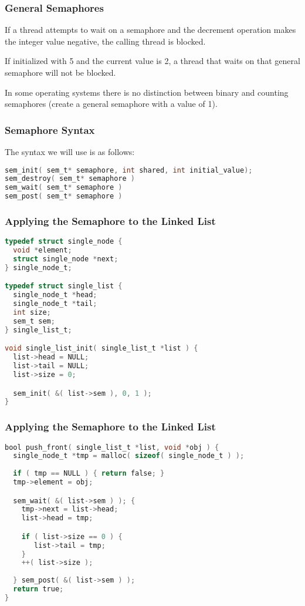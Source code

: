 \begin{frame}
	\frametitle{General Semaphores}

	If a thread attempts to wait on a semaphore and the decrement operation makes the integer value negative, the calling thread is blocked.

	If initialized with 5 and the current value is 2, a thread that waits on that general semaphore will not be blocked.

	In some operating systems there is no distinction between binary and counting semaphores (create a general semaphore with a value of 1).

\end{frame}

\begin{frame}[fragile]
	\frametitle{Semaphore Syntax}

	The syntax we will use is as follows:

	\begin{lstlisting}[language=C]
sem_init( sem_t* semaphore, int shared, int initial_value);
sem_destroy( sem_t* semaphore )
sem_wait( sem_t* semaphore )
sem_post( sem_t* semaphore )
\end{lstlisting}

\end{frame}

\begin{frame}[fragile]
	\frametitle{Applying the Semaphore to the Linked List}

	\begin{lstlisting}[language=C]
typedef struct single_node {
  void *element;
  struct single_node *next;
} single_node_t;

typedef struct single_list {
  single_node_t *head;
  single_node_t *tail;
  int size;
  sem_t sem;
} single_list_t;

void single_list_init( single_list_t *list ) {
  list->head = NULL;
  list->tail = NULL;
  list->size = 0;

  sem_init( &( list->sem ), 0, 1 );
}
\end{lstlisting}

\end{frame}

\begin{frame}[fragile]
	\frametitle{Applying the Semaphore to the Linked List}

	\begin{lstlisting}[language=C]
bool push_front( single_list_t *list, void *obj ) {
  single_node_t *tmp = malloc( sizeof( single_node_t ) );
  
  if ( tmp == NULL ) { return false; }  
  tmp->element = obj;

  sem_wait( &( list->sem ) ); {  
    tmp->next = list->head;
    list->head = tmp;

    if ( list->size == 0 ) {
       list->tail = tmp;
    }
    ++( list->size );
  
  } sem_post( &( list->sem ) );
  return true;
}
\end{lstlisting}


\end{frame}

